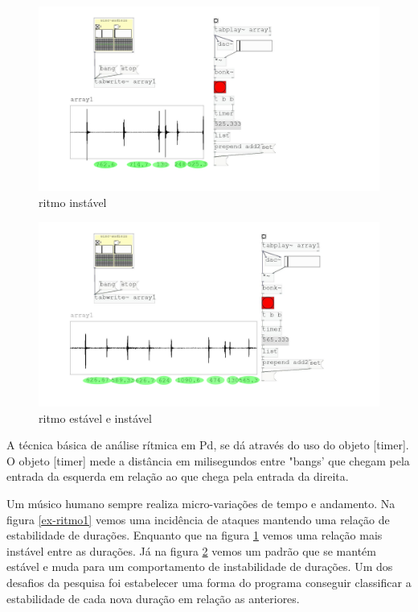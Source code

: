 \documentclass{ppgmus}
\begin{document}
\begin{figure}
\includegraphics[scale=.4]{ex-ritmo2}
\caption{ritmo instável}
\label{ex-ritmo2}
\end{figure}

\begin{figure}
\includegraphics[scale=.4]{ex-ritmo3}
\caption{ritmo estável e instável}
\label{ex-ritmo3}
\end{figure}


A técnica básica de análise rítmica em Pd, se dá através do uso do objeto [timer].
O objeto [timer] mede a distância em milisegundos entre "bangs' que chegam pela entrada
da esquerda em relação ao que chega pela entrada da direita.%


Um músico humano sempre realiza micro-variações de tempo e andamento.
Na figura \ref{ex-ritmo1} vemos uma incidência de ataques mantendo uma relação de estabilidade
de durações. Enquanto que na figura \ref{ex-ritmo2} vemos uma relação mais instável
entre as durações. Já na figura \ref{ex-ritmo3} vemos um padrão que se mantém estável e 
muda para um comportamento de instabilidade de durações. Um dos desafios da pesquisa
foi estabelecer uma forma do programa conseguir classificar a estabilidade de cada nova duração em relação
as anteriores.
\end{document}

